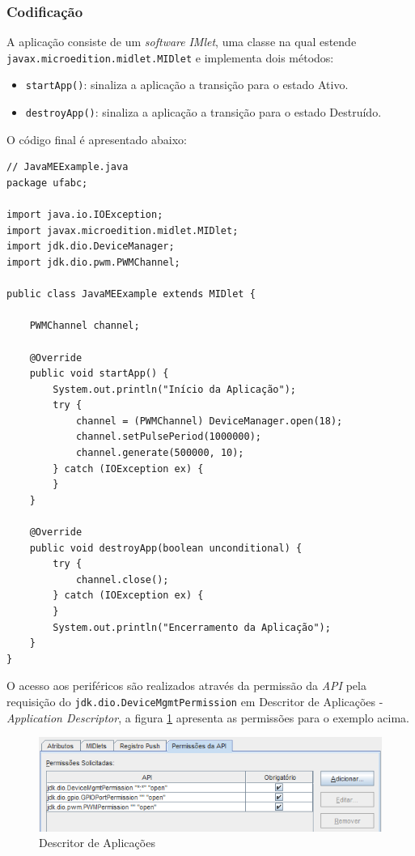 \subsubsection{Codificação}

A aplicação consiste de um \textit{software} \textit{IMlet}, uma classe na qual 
estende \newline
 \verb|javax.microedition.midlet.MIDlet| e implementa dois métodos:

\begin{itemize}
    
    \item \verb|startApp()|: sinaliza a aplicação a transição para o estado 
    Ativo.
    
    \item \verb|destroyApp()|: sinaliza a aplicação a transição para o estado 
    Destruído.
    
\end{itemize}

O código final é apresentado abaixo:
\newpage
\begin{verbatim}
// JavaMEExample.java
package ufabc;

import java.io.IOException;
import javax.microedition.midlet.MIDlet;
import jdk.dio.DeviceManager;
import jdk.dio.pwm.PWMChannel;

public class JavaMEExample extends MIDlet {
    
    PWMChannel channel;
    
    @Override
    public void startApp() {
        System.out.println("Início da Aplicação");
        try {
            channel = (PWMChannel) DeviceManager.open(18);
            channel.setPulsePeriod(1000000);
            channel.generate(500000, 10);
        } catch (IOException ex) {
        }
    }

    @Override
    public void destroyApp(boolean unconditional) {
        try {
            channel.close();
        } catch (IOException ex) {
        }
        System.out.println("Encerramento da Aplicação");
    }
}
\end{verbatim}

O acesso aos periféricos são realizados através da permissão da \textit{API} pela requisição do \verb|jdk.dio.DeviceMgmtPermission| em 
Descritor de Aplicações - \textit{Application Descriptor}, a figura 
\ref{fig:java-me/application-descriptor} apresenta as permissões para o exemplo 
acima.

\begin{figure}[H]
    \centering
    \includegraphics[width=0.7\linewidth]{figuras/java/java-me-application-descriptor.png}
    \caption{Descritor de Aplicações}
    \label{fig:java-me/application-descriptor}
\end{figure}

